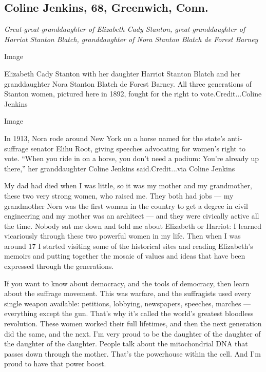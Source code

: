\hypertarget{coline-jenkins-68-greenwich-conn}{%
\subsection{Coline Jenkins, 68, Greenwich,
Conn.}\label{coline-jenkins-68-greenwich-conn}}

\emph{Great-great-granddaughter of Elizabeth Cady Stanton,
great-granddaughter of Harriot Stanton Blatch, granddaughter of Nora
Stanton Blatch de Forest Barney}

Image

Elizabeth Cady Stanton with her daughter Harriot Stanton Blatch and her
granddaughter Nora Stanton Blatch de Forest Barney. All three
generations of Stanton women, pictured here in 1892, fought for the
right to vote.Credit...Coline Jenkins

Image

In 1913, Nora rode around New York on a horse named for the state's
anti-suffrage senator Elihu Root, giving speeches advocating for women's
right to vote. ``When you ride in on a horse, you don't need a podium:
You're already up there,'' her granddaughter Coline Jenkins
said.Credit...via Coline Jenkins

My dad had died when I was little, so it was my mother and my
grandmother, these two very strong women, who raised me. They both had
jobs --- my grandmother Nora was the first woman in the country to get a
degree in civil engineering and my mother was an architect --- and they
were civically active all the time. Nobody sat me down and told me about
Elizabeth or Harriot: I learned vicariously through these two powerful
women in my life. Then when I was around 17 I started visiting some of
the historical sites and reading Elizabeth's memoirs and putting
together the mosaic of values and ideas that have been expressed through
the generations.

If you want to know about democracy, and the tools of democracy, then
learn about the suffrage movement. This was warfare, and the suffragists
used every single weapon available: petitions, lobbying, newspapers,
speeches, marches --- everything except the gun. That's why it's called
the world's greatest bloodless revolution. These women worked their full
lifetimes, and then the next generation did the same, and the next. I'm
very proud to be the daughter of the daughter of the daughter of the
daughter. People talk about the mitochondrial DNA that passes down
through the mother. That's the powerhouse within the cell. And I'm proud
to have that power boost.


